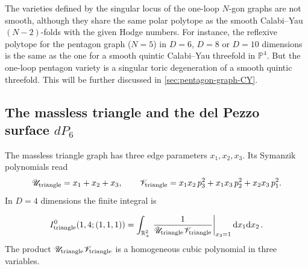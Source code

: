 \documentclass[12pt,a4paper]{article}
\theoremstyle{plain}
\theoremstyle{remark}
\newcommand{\nprops}{N}
\newcommand{\dd}{\mathrm{d}}
\newcommand{\cU}{\mathscr {U}}
\newcommand{\cV}{\mathscr {V}}
\begin{document}
The varieties defined by the singular locus of
the one-loop $\nprops$-gon graphs are not smooth, although they share 
the same polar polytope as the smooth Calabi--Yau $(\nprops-2)$-folds with
the given Hodge numbers.
For instance, the reflexive polytope for the pentagon graph
($\nprops=5$) in $D=6$, $D=8$ or $D=10$ dimensions is the same as the one for a smooth quintic  Calabi--Yau  threefold  in $\mathbb P^4$.  But the one-loop pentagon variety is a
singular toric degeneration of a smooth  quintic threefold. This will
be further discussed in \cref{sec:pentagon-graph-CY}.

\subsection{The massless triangle and the del Pezzo surface $dP_6$}
\label{massless-triangle}
The massless triangle graph has three edge parameters $x_1,x_2,x_3$.
Its Symanzik polynomials read 
\begin{equation}
\cU_{\rm triangle}=x_1+x_2+x_3, \qquad
\cV_{\rm triangle}=x_1 x_2\, p_3^2 + x_1 x_3\, p_2^2 + x_2 x_3\, p_1^2 .
\end{equation}
%
In $D=4$ dimensions the finite integral is 

	\begin{equation}\label{e:triangle-massless-fourD}
			 I_{\rm triangle}^0(1,4;(1,1,1))=
                        \int_{\mathbb R_+^{2}}\left. {1\over \cU_{\rm
					triangle}\cV_{\rm triangle}}\right|_{x_3=1} \dd x_1  \dd x_2\, .  
                                  \end{equation}
%
The product $\cU_{\rm triangle} \cV_{\rm triangle}$ is a homogeneous cubic polynomial
in three variables. 
 
\end{document}
